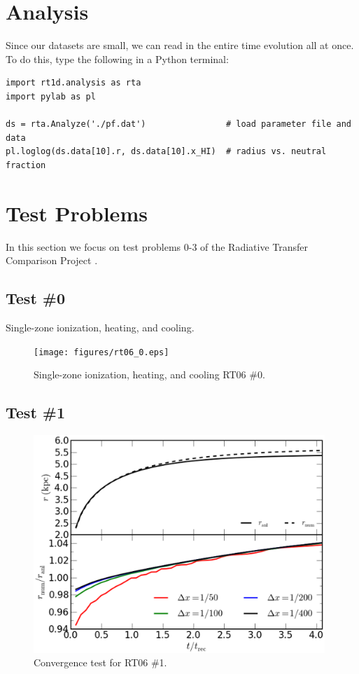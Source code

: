 \documentclass[letterpaper,titlepage,12pt]{article}
\numberwithin{equation}{section}
\begin{document}
\section{Analysis}
Since our datasets are small, we can read in the entire time evolution all at once.  To do this, type the following in a Python terminal:
\begin{verbatim}
import rt1d.analysis as rta
import pylab as pl

ds = rta.Analyze('./pf.dat')                # load parameter file and data
pl.loglog(ds.data[10].r, ds.data[10].x_HI)  # radius vs. neutral fraction
\end{verbatim}

\section{Test Problems}
In this section we focus on test problems 0-3 of the Radiative Transfer Comparison Project \citep[hereafter RT06;][]{Iliev2006}.

\subsection{Test \#0}
Single-zone ionization, heating, and cooling.

\begin{figure}[htbp!]
\begin{center}
\texttt{[image: figures/rt06\_0.eps]}
\caption{Single-zone ionization, heating, and cooling RT06 \#0.}
\label{fig:RT06_0}
\end{center}
\end{figure}

\subsection{Test \#1}

\begin{figure}[htbp!]
\begin{center}
\includegraphics[width=0.98\textwidth]{figures/rt06_1_convergence.eps}
\caption{Convergence test for RT06 \#1.}
\label{fig:RT06_1}
\end{center}
\end{figure}
\end{document}
